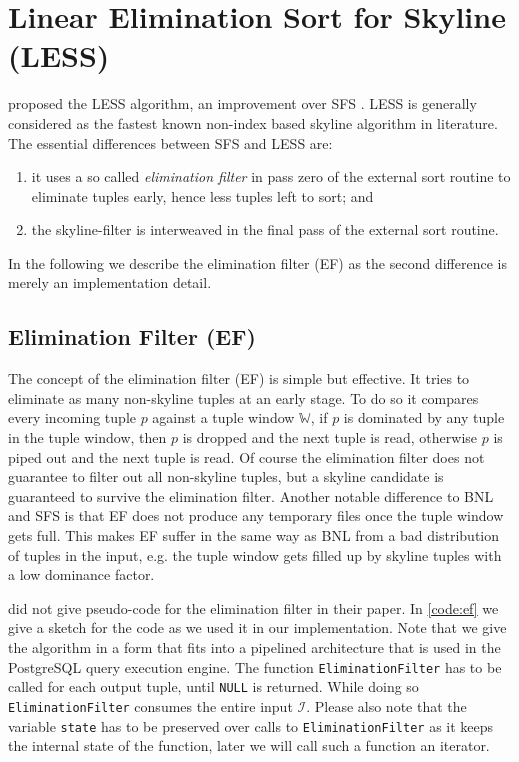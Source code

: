 \section{Linear Elimination Sort for Skyline (LESS)}
\citet{Godfrey2005} proposed the LESS algorithm, an improvement
over SFS \citep{Chomicki2003}. LESS is generally considered as the fastest
known non-index based skyline algorithm in literature. The essential
differences between SFS and LESS are:

\begin{enumerate}
\item 
it uses a so called \emph{elimination filter} in pass zero of the
external sort routine to eliminate tuples early, hence less tuples left
to sort; and
\item
the skyline-filter is interweaved in the final pass of the external
sort routine.
\end{enumerate}

In the following we describe the elimination filter (EF) as the second
difference is merely an implementation detail.

\subsection{Elimination Filter (EF)}
\label{sec:ef-tuple-order}
The concept of the elimination filter (EF) is simple but effective.  It
tries to eliminate as many non-skyline tuples at an early stage.  To
do so it compares every incoming tuple $p$ against a tuple window
$\mathbb{W}$, if $p$ is dominated by any tuple in the tuple window,
then $p$ is dropped and the next tuple is read, otherwise $p$ is piped
out and the next tuple is read.  Of course the elimination filter does not
guarantee to filter out all non-skyline tuples, but a skyline candidate
is guaranteed to survive the elimination filter.  Another notable
difference to BNL and SFS is that EF does not produce any temporary
files once the tuple window gets full.  This makes EF suffer in the
same way as BNL from a bad distribution of tuples in the input, e.g.
the tuple window gets filled up by skyline tuples with a low dominance
factor.

\citet{Godfrey2005} did not give pseudo-code for the elimination
filter in their paper. In \autoref{code:ef} we give a sketch for
the code as we used it in our implementation. Note that we give
the algorithm in a form that fits into a pipelined architecture
that is used in the PostgreSQL query execution engine. The function
\texttt{EliminationFilter} has to be called for each output tuple,
until \texttt{NULL} is returned. While doing so
\texttt{EliminationFilter} consumes the entire input $\mathcal{I}$.
Please also note that the variable \texttt{state} has to be preserved
over calls to \texttt{EliminationFilter} as it keeps the internal
state of the function, later we will call such a function an iterator.


